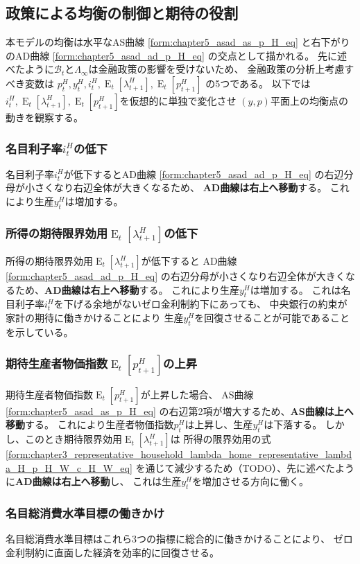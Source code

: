 
\subsection{政策による均衡の制御と期待の役割}
\label{sec:chapter5_asad_monetary_policy}
本モデルの均衡は水平なAS曲線
\eqref{form:chapter5_asad_as_p_H_eq}
と右下がりのAD曲線
\eqref{form:chapter5_asad_ad_p_H_eq}
の交点として描かれる。
先に述べたように\(\mathcal{B}_t\)と\(\Lambda_{\infty}\)は金融政策の影響を受けないため、
金融政策の分析上考慮すべき変数は
\(p_t^H,y_t^H,i_t^H,\operatorname{E}_t[\lambda_{t+1}^H],\operatorname{E}_t[p_{t+1}^H]\)
の5つである。
以下では\(i_t^H,\operatorname{E}_t[\lambda_{t+1}^H],\operatorname{E}_t[p_{t+1}^H]\)を仮想的に単独で変化させ
\((y,p)\)平面上の均衡点の動きを観察する。

\subsubsection{名目利子率\(i_t^H\)の低下}
\label{sec:chapter5_asad_monetary_policy_i_H_fall}
名目利子率\(i_t^H\)が低下するとAD曲線
\eqref{form:chapter5_asad_ad_p_H_eq}
の右辺分母が小さくなり右辺全体が大きくなるため、
\textbf{AD曲線は右上へ移動}する。
これにより生産\(y_t^H\)は増加する。

\subsubsection{所得の期待限界効用\(\operatorname{E}_t[\lambda_{t+1}^H]\)の低下}
\label{sec:chapter5_asad_monetary_policy_E_lambda_H_fall}
所得の期待限界効用\(\operatorname{E}_t[\lambda_{t+1}^H]\)が低下すると
AD曲線
\eqref{form:chapter5_asad_ad_p_H_eq}
の右辺分母が小さくなり右辺全体が大きくなるため、\textbf{AD曲線は右上へ移動}する。
これにより生産\(y_t^H\)は増加する。
これは名目利子率\(i_t^H\)を下げる余地がないゼロ金利制約下にあっても、
中央銀行の約束が家計の期待に働きかけることにより
生産\(y_t^H\)を回復させることが可能であることを示している。

\subsubsection{期待生産者物価指数\(\operatorname{E}_t[p_{t+1}^H]\)の上昇}
\label{sec:chapter5_asad_monetary_policy_E_p_H_rise}
期待生産者物価指数\(\operatorname{E}_t[p_{t+1}^H]\)が上昇した場合、
AS曲線
\eqref{form:chapter5_asad_as_p_H_eq}
の右辺第2項が増大するため、\textbf{AS曲線は上へ移動}する。
これにより生産者物価指数\(p_t^H\)は上昇し、生産\(y_t^H\)は下落する。
しかし、このとき期待限界効用\(\operatorname{E}_t[\lambda_{t+1}^H]\)は
所得の限界効用の式
\eqref{form:chapter3_representative_household_lambda_home_representative_lambda_H_p_H_W_c_H_W_eq}
を通じて減少するため（TODO）、先に述べたように\textbf{AD曲線は右上へ移動}し、
これは生産\(y_t^H\)を増加させる方向に働く。

\subsubsection{名目総消費水準目標の働きかけ}
名目総消費水準目標はこれら3つの指標に総合的に働きかけることにより、
ゼロ金利制約に直面した経済を効率的に回復させる。